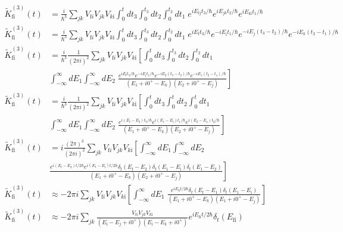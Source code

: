 \documentclass[]{article}
\begin{document}
\begin{enumerate}[1)]
\begin{equation}
\begin{split}
\tilde{K}_\text{fi}^{(3)}(t) & = \frac{i}{\hbar^3} \sum_{jk} V_{\text{f} i} V_{jk} V_{k \text{i}}  \int_{0}^{t} dt_3 \int_{0}^{t_3} dt_2 \int_{0}^{t_2} dt_1 \;  e^{ i E_{\text{f} j} t_3 /\hbar } e^{ i E_{jk} t_2 /\hbar } e^{ i E_{k \text{i} } t_1 /\hbar } \\
\tilde{K}_\text{fi}^{(3)}(t) & = \frac{i}{\hbar^3} \sum_{jk} V_{\text{f} i} V_{jk} V_{k \text{i}}  \int_{0}^{t} dt_3 \int_{0}^{t_3} dt_2 \int_{0}^{t_2} dt_1 \;  e^{i E_\text{f} t_3 / \hbar}  e^{ - i E_\text{i} t_1 / \hbar}  e^{ - i E_j ( t_3  - t_2) / \hbar}  e^{- i E_k ( t_2 - t_1) / \hbar}      \\
%
\tilde{K}_\text{fi}^{(3)}(t) & = \frac{i}{\hbar^3}  \frac{1}{(2\pi i)^2} \sum_{jk} V_{\text{f} i} V_{jk} V_{k \text{i}} \left[   \int_{0}^{t} dt_3 \int_{0}^{t_3} dt_2 \int_{0}^{t_2} dt_1    \right. \\ & \left.  \int_{-\infty}^{\infty} dE_1 \int_{-\infty}^{\infty} dE_2 \; \frac{  e^{i E_\text{f} t_3 / \hbar}  e^{ - i E_\text{i} t_1 / \hbar} e^{ - i E_2 ( t_3  - t_2) / \hbar}  e^{- i E_1 ( t_2 - t_1) / \hbar}  }{   \left(  E_1 + i0^+ - E_k \right) \left(  E_2 + i0^+ - E_j \right)   }  \right] \\ 
%
\tilde{K}_\text{fi}^{(3)}(t) & = \frac{i}{\hbar^3}  \frac{1}{(2\pi i)^2} \sum_{jk} V_{\text{f} i} V_{jk} V_{k \text{i}} \left[   \int_{0}^{t} dt_3 \int_{0}^{t} dt_2 \int_{0}^{t} dt_1    \right. \\ & \left.  \int_{-\infty}^{\infty} dE_1 \int_{-\infty}^{\infty} dE_2 \; \frac{  e^{i ( E_\text{f} - E_2  ) t_3 / \hbar}  e^{  i ( E_1 -  E_\text{i} )t_1 / \hbar} e^{ i ( E_2 - E_1) t_2 / \hbar}  }{   \left(  E_1 + i0^+ - E_k \right) \left(  E_2 + i0^+ - E_j \right)   }  \right] \\
%
\tilde{K}_\text{fi}^{(3)}(t) & = i \frac{(2\pi)^3}{(2\pi i)^2} \sum_{jk} V_{\text{f} i} V_{jk} V_{k \text{i}} \left[  \int_{-\infty}^{\infty} dE_1 \int_{-\infty}^{\infty} dE_2 \; \right. \\& \left.    \frac{  e^{i ( E_\text{f} - E_2  ) t / 2 \hbar}  e^{  i ( E_1 -  E_\text{i} )t / 2 \hbar}  \delta_t ( E_\text{f} -  E_2  )   \delta_t ( E_1 -  E_\text{i}  )  \delta_t ( E_1 -  E_2 )     }{   \left(  E_1 + i0^+ - E_k \right) \left(  E_2 + i0^+ - E_j \right)   }  \right] \\
%
\tilde{K}_\text{fi}^{(3)}(t) & \approx - 2\pi i \sum_{jk} V_{\text{f} i} V_{jk} V_{k \text{i}} \left[  \int_{-\infty}^{\infty} dE_1 \;   \frac{  e^{i  E_\text{fi} t / 2 \hbar}  \delta_t ( E_\text{f} -  E_1  )   \delta_t ( E_1 -  E_\text{i}  )      }{   \left(  E_1 + i0^+ - E_k \right) \left(  E_1 + i0^+ - E_j \right)   }  \right] \\
%
\tilde{K}_\text{fi}^{(3)}(t) & \approx - 2\pi i \sum_{jk}  \frac{  V_{\text{f} i} V_{jk} V_{k \text{i}}        }{   \left(  E_\text{i}  - E_j+ i0^+  \right) \left(  E_\text{i}  - E_k + i0^+ \right)   } e^{i  E_\text{fi} t / 2 \hbar}   \delta_t ( E_\text{fi} )  \\
%
\end{split}
\end{equation}


\end{enumerate}
\end{document}
